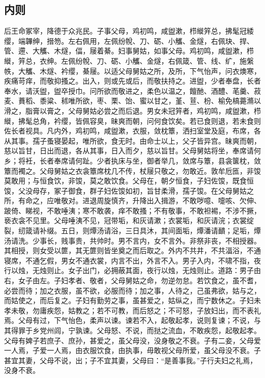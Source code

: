 \documentclass[]{article}
\begin{document}
\hypertarget{header-n431}{%
\subsection{内则}\label{header-n431}}

后王命冢宰，降德于众兆民。子事父母，鸡初鸣，咸盥漱，栉縰笄总，拂髦冠緌缨，端韠绅，搢笏。左右佩用，左佩纷帨、刀、砺、小觿、金燧，右佩玦、捍、管、遰、大觿、木燧，偪，屦着綦。妇事舅姑，如事父母。鸡初鸣，咸盥漱，栉縰，笄总，衣绅。左佩纷帨、刀、砺、小觿、金燧，右佩箴、管、线、纩，施縏帙，大觿、木燧、衿缨，綦屦。以适父母舅姑之所，及所，下气怡声，问衣燠寒，疾痛苛痒，而敬抑搔之。出入，则或先或后，而敬扶持之。进盥，少者奉盘，长者奉水，请沃盥，盥卒授巾。问所欲而敬进之，柔色以温之，饘酏、酒醴、芼羹、菽麦、蕡稻、黍粱、秫唯所欲，枣、栗、饴、蜜以甘之，堇、荁、枌、榆免槁薧滫以滑之，脂膏以膏之，父母舅姑必尝之而后退。男女未冠笄者，鸡初鸣，咸盥漱，栉縰，拂髦总角，衿缨，皆佩容臭，昧爽而朝，问何食饮矣。若已食则退，若未食则佐长者视具。凡内外，鸡初鸣，咸盥漱，衣服，敛枕簟，洒扫室堂及庭，布席，各从其事。孺子蚤寝晏起，唯所欲，食无时。由命士以上，父子皆异宫。昧爽而朝，慈以旨甘，日出而退，各从其事，日入而夕，慈以旨甘。父母舅姑将坐，奉席请何乡；将衽，长者奉席请何趾。少者执床与坐，御者举几，敛席与簟，县衾箧枕，敛簟而襡之。父母舅姑之衣衾簟席枕几不传，杖屦只敬之，勿敢近。敦牟卮匜，非馂莫敢用；与恒食饮，非馂，莫之敢饮食。父母在，朝夕恒食，子妇佐馂，既食恒馂，父没母存，冢子御食，群子妇佐馂如初，旨甘柔滑，孺子馂。在父母舅姑之所，有命之，应唯敬对。进退周旋慎齐，升降出入揖游，不敢哕噫、嚏咳、欠伸、跛倚、睇视，不敢唾洟；寒不敢袭，痒不敢搔；不有敬事，不敢袒裼，不涉不撅，亵衣衾不见里。父母唾洟不见，冠带垢，和灰请漱；衣裳垢，和灰请浣；衣裳绽裂，纫箴请补缀。五日，则燂汤请浴，三日具沐，其间面垢，燂潘请靧；足垢，燂汤请洗。少事长，贱事贵，共帅时。男不言内，女不言外。非祭非丧，不相授器。其相授，则女受以篚，其无篚则皆坐奠之而后取之。外内不共井，不共湢浴，不通寝席，不通乞假，男女不通衣裳，内言不出，外言不入。男子入内，不啸不指，夜行以烛，无烛则止。女子出门，必拥蔽其面，夜行以烛，无烛则止。道路：男子由右，女子由左。子妇孝者、敬者，父母舅姑之命，勿逆勿怠。若饮食之，虽不耆，必尝而待；加之衣服，虽不欲，必服而待；加之事，人待之，己虽弗欲，姑与之，而姑使之，而后复之。子妇有勤劳之事，虽甚爱之，姑纵之，而宁数休之。子妇未孝未敬，勿庸疾怨，姑教之；若不可教，而后怒之；不可怒，子放妇出，而不表礼焉。父母有过，下气怡色，柔声以谏。谏若不入，起敬起孝，说则复谏；不说，与其得罪于乡党州闾，宁孰谏。父母怒、不说，而挞之流血，不敢疾怨，起敬起孝。父母有婢子若庶子、庶孙，甚爱之，虽父母没，没身敬之不衰。子有二妾，父母爱一人焉，子爱一人焉，由衣服饮食，由执事，毋敢视父母所爱，虽父母没不衰。子甚宜其妻，父母不说，出；子不宜其妻，父母曰：``是善事我。''子行夫妇之礼焉，没身不衰。
\end{document}
